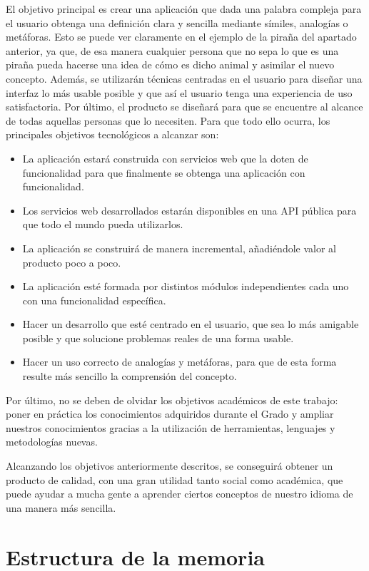 El objetivo principal es crear una aplicación que dada una palabra compleja para el usuario obtenga una definición clara y sencilla mediante símiles, analogías o metáforas. 
Esto se puede ver claramente en el ejemplo de la piraña del apartado anterior, ya que, de esa manera cualquier persona que no sepa lo que es una piraña pueda hacerse una idea de cómo es dicho animal y asimilar el nuevo concepto. Además, se utilizarán técnicas centradas en el usuario para diseñar una interfaz lo más usable posible y que así el usuario tenga una experiencia de uso satisfactoria. Por último, el producto se diseñará para que se encuentre al alcance de todas aquellas personas que lo necesiten.
 Para que todo ello ocurra, los principales objetivos tecnológicos a alcanzar son:
\begin{itemize}
	\item La aplicación estará construida con servicios web que la doten de funcionalidad para que finalmente se obtenga una aplicación con funcionalidad. 
	\item Los servicios web desarrollados estarán disponibles en una API pública para que todo el mundo pueda utilizarlos.	
	\item La aplicación se construirá de manera incremental, añadiéndole valor al producto poco a poco.	
	\item La aplicación esté formada por distintos módulos independientes cada uno con una funcionalidad específica.
	\item Hacer un desarrollo que esté centrado en el usuario, que sea lo más amigable posible y que solucione problemas reales de una forma usable.
	\item Hacer un uso correcto de analogías y metáforas, para que de esta forma resulte más sencillo la comprensión del concepto.
\end{itemize}

Por último, no se deben de olvidar los objetivos académicos de este trabajo: poner en práctica los conocimientos adquiridos durante el Grado y ampliar nuestros conocimientos gracias a la utilización de herramientas, lenguajes y metodologías nuevas.

Alcanzando los objetivos anteriormente descritos, se conseguirá obtener un producto de calidad, con una gran utilidad tanto social como académica, que puede ayudar a mucha gente a aprender ciertos conceptos de nuestro idioma de una manera más sencilla.
	
	
\section{Estructura de la memoria}
\label{cap:sec:estructuramemoria}



